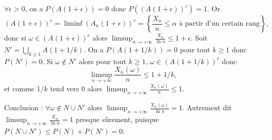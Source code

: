 {\begin{enumerate}
{\medskip
$\forall\epsilon>0$, on a $P(A(1+\epsilon))=0$ donc $P((A(1+\epsilon))^c)=1$.
Or 
$$
(A(1+\epsilon))^c=\liminf (A_n(1+\epsilon))^c=\left\{\frac{X_n}{n}\leq \alpha 
\mbox{ à partir d'un certain rang}\right\},$$ 
donc si $\omega\in (A(1+\epsilon))^c$ 
alors $\displaystyle \limsup_{n\to +\infty}\frac{X_n}{\ln n}\leq 1+\epsilon$.
Soit $N'=\displaystyle\bigcup_{k\geq 1} A(1+1/k)$.
On a $P(A(1+1/k))=0$ pour tout $k\geq 1$ donc $P(N')=0$. Si
$\omega\not \in N'$ alors pour tout $k\geq 1$, $\omega\in (A(1+1/k))^c$
donc 
$$\limsup_{n\to+\infty}\frac{X_n(\omega)}{n}\leq 1+1/k,$$ 
et comme $1/k$ tend vers $0$ alors $\displaystyle\limsup_{n\to+\infty}\frac{X_n(\omega)}{n}\leq 1$.


Conclusion : $\forall \omega\not\in N\cup N'$ alors $\displaystyle \limsup_{n\to+\infty}
\frac{X_n(\omega)}{\ln n}=1$. Autrement dit
$\displaystyle\limsup_{n\to+\infty}\frac{X_n}{\ln n}=1$ presque sûrement, puisque
$P(N\cup N')\leq P(N)+P(N')=0$.}
\end{enumerate}
}
